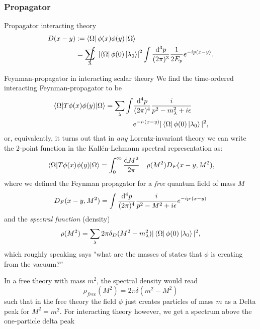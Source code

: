 \subsubsection{Propagator}
\begin{mybox}{Propagator interacting theory}
\begin{align}
	D(x-y)&:=\bra{\Omega}\phi(x)\phi(y)\ket{\Omega} \\
	&=\sum_\lambda \hspace{-0.4cm}\int \;\abs{\bra{\Omega}\phi(0)\ket{\lambda_0}}^2 \int \pmeasure \frac{1}{2 E_p} e^{-ip(x-y)}.\nonumber
\end{align}
\end{mybox}
\begin{mybox}{Feynman-propagator in interacting scalar theory}
We find the time-ordered interacting Feynman-propagator to be
\begin{align}
\expval{T\phi(x)\phi(y)}{\Omega} = \sum_{\lambda} \int& \frac{\mathrm{d}^4 p}{(2 \pi)^4} \frac{i}{p^2-m^2_{\lambda} +i\epsilon}\\
& e^{- i \cdot (x-y)} |\bra{\Omega}\phi(0)\ket{\lambda_0}|^2\nonumber,
\end{align}
or, equivalently, it turns out that in \emph{any} Lorentz-invariant theory we can
write the $2$-point function in the Kallén-Lehmann spectral representation as:
\begin{equation}
	\expval{T\phi(x)\phi(y)}{\Omega} = \int_0^{\infty} \frac{\mathrm{d} M^2}{2 \pi} \quad \rho(M^2) D_F(x-y,M^2),
\end{equation}
where we defined the Feynman propagator for a \emph{free} quantum field of mass $M$
\begin{equation}
	D_F(x-y, M^2) = \int \frac{\mathrm{d}^4 p}{(2 \pi)^4} \frac{i}{p^2-M^2+i\epsilon} e^{-i p\cdot (x-y)} 
\end{equation}
and the \emph{spectral function} (density)
\begin{equation}
	\rho(M^2) = \sum_{\lambda} 2 \pi \delta_D(M^2-m^2_{\lambda}) |\bra{\Omega} \phi(0) \ket{\lambda_0}|^2,
\end{equation}
which roughly speaking says "what are the masses of states that $\phi$ is creating
from the vacuum?”
\end{mybox}
In a free theory with mass $m^2$, the spectral density would read
\begin{equation*}
	\rho_{free}(M^2) = 2\pi \delta (m^2-M^2)
\end{equation*}
such that in the free theory the field $\phi$ just creates particles of mass $m$ as a Delta peak for $M^2=m^2$. For interacting theory however, we get a spectrum above the one-particle delta peak
